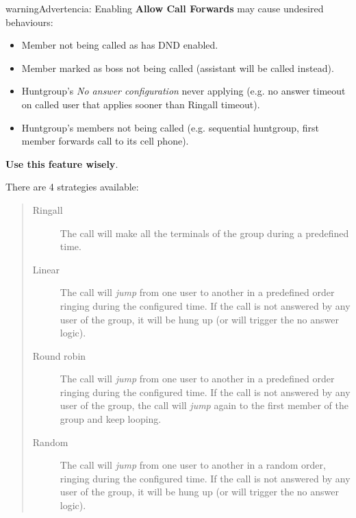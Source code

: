 \documentclass[letterpaper,10pt,spanish]{sphinxmanual}
\begin{document}
\begin{notice}{warning}{Advertencia:}
Enabling \textbf{Allow Call Forwards} may cause undesired behaviours:
\begin{itemize}
\item {} 
Member not being called as has DND enabled.

\item {} 
Member marked as boss not being called (assistant will be called instead).

\item {} 
Huntgroup's \emph{No answer configuration} never applying (e.g. no answer timeout on called user that applies sooner than Ringall timeout).

\item {} 
Huntgroup's members not being called (e.g. sequential huntgroup, first member forwards call to its cell phone).

\end{itemize}

\textbf{Use this feature wisely}.
\end{notice}

There are 4 strategies available:
\begin{quote}
\begin{description}
\item[{Ringall}] \leavevmode
The call will make all the terminals of the group during a predefined
time.

\item[{Linear}] \leavevmode
The call will \emph{jump} from one user to another in a predefined order
ringing during the configured time. If the call is not answered by any
user of the group, it will be hung up (or will trigger the no answer logic).

\item[{Round robin}] \leavevmode
The call will \emph{jump} from one user to another in a predefined order
ringing during the configured time. If the call is not answered by any
user of the group, the call will \emph{jump} again to the first member of the
group and keep looping.

\item[{Random}] \leavevmode
The call will \emph{jump} from one user to another in a random order,
ringing during the configured time.  If the call is not answered by any
user of the group, it will be hung up (or will trigger the no answer logic).

\end{description}
\end{quote}
\end{document}

